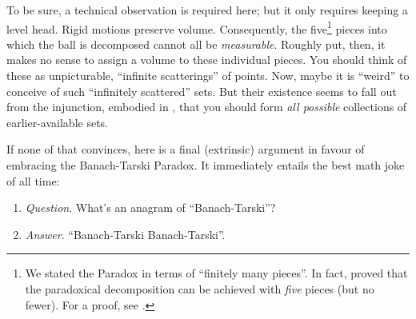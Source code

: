 \documentclass[../../../include/open-logic-section]{subfiles}
\begin{document}
To be sure, a technical observation is required here; but it only
requires keeping a level head. Rigid motions preserve volume.
Consequently, the five\footnote{We stated the Paradox in terms of
``finitely many pieces''. In fact, \citet{Robinson1947} proved that
the paradoxical decomposition can be achieved with \emph{five} pieces
(but no fewer). For a proof, see \citet[pp.~66--7]{Wagon2016}.} pieces
into which the ball is decomposed cannot all be \emph{measurable}.
Roughly put, then, it makes no sense to assign a volume to these
individual pieces. You should think of these as unpicturable,
``infinite scatterings'' of points. Now, maybe it is ``weird'' to
conceive of such ``infinitely scattered'' sets. But their existence
seems to fall out from the injunction, embodied in \stagesacc{}, that
you should form \emph{all possible} collections of earlier-available
sets. 

If none of that convinces, here is a final (extrinsic) argument in
favour of embracing the Banach-Tarski Paradox. It immediately entails
the best math joke of all time:
\begin{enumerate}
	\item[] \emph{Question}. What's an anagram of ``Banach-Tarski''? 
	\item[] \emph{Answer}. ``Banach-Tarski Banach-Tarski''.
\end{enumerate}
\end{document}
